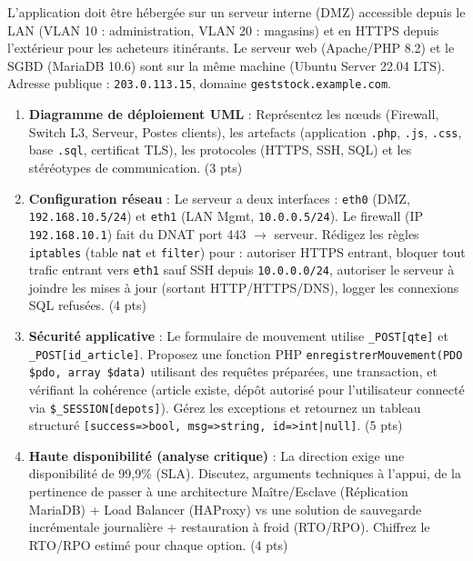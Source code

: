 \documentclass[11pt]{article}
\begin{document}
\begin{exercice}
L'application doit être hébergée sur un serveur interne (DMZ) accessible depuis le LAN (VLAN 10 : administration, VLAN 20 : magasins) et en HTTPS depuis l'extérieur pour les acheteurs itinérants. Le serveur web (Apache/PHP 8.2) et le SGBD (MariaDB 10.6) sont sur la même machine (Ubuntu Server 22.04 LTS). Adresse publique : \texttt{203.0.113.15}, domaine \texttt{geststock.example.com}.

\begin{enumerate}
    \item \textbf{Diagramme de déploiement UML} : Représentez les nœuds (Firewall, Switch L3, Serveur, Postes clients), les artefacts (application \texttt{.php}, \texttt{.js}, \texttt{.css}, base \texttt{.sql}, certificat TLS), les protocoles (HTTPS, SSH, SQL) et les stéréotypes de communication. (3 pts)
    \item \textbf{Configuration réseau} : Le serveur a deux interfaces : \texttt{eth0} (DMZ, \texttt{192.168.10.5/24}) et \texttt{eth1} (LAN Mgmt, \texttt{10.0.0.5/24}). Le firewall (IP \texttt{192.168.10.1}) fait du DNAT port 443 $\rightarrow$ serveur. Rédigez les règles \texttt{iptables} (table \texttt{nat} et \texttt{filter}) pour : autoriser HTTPS entrant, bloquer tout trafic entrant vers \texttt{eth1} sauf SSH depuis \texttt{10.0.0.0/24}, autoriser le serveur à joindre les mises à jour (sortant HTTP/HTTPS/DNS), logger les connexions SQL refusées. (4 pts)
    \item \textbf{Sécurité applicative} : Le formulaire de mouvement utilise \texttt{\textdollar\_POST[\textquotesingle qte\textquotesingle]} et \texttt{\textdollar\_POST[\textquotesingle id\_article\textquotesingle]}. Proposez une fonction PHP \texttt{enregistrerMouvement(PDO \$pdo, array \$data)} utilisant des requêtes préparées, une transaction, et vérifiant la cohérence (article existe, dépôt autorisé pour l'utilisateur connecté via \texttt{\$\_SESSION[\textquotesingle depots\textquotesingle]}). Gérez les exceptions et retournez un tableau structuré \texttt{[\textquotesingle success\textquotesingle=>bool, \textquotesingle msg\textquotesingle=>string, \textquotesingle id\textquotesingle=>int|null]}. (5 pts)
    \item \textbf{Haute disponibilité (analyse critique)} : La direction exige une disponibilité de 99,9\% (SLA). Discutez, arguments techniques à l'appui, de la pertinence de passer à une architecture Maître/Esclave (Réplication MariaDB) + Load Balancer (HAProxy) vs une solution de sauvegarde incrémentale journalière + restauration à froid (RTO/RPO). Chiffrez le RTO/RPO estimé pour chaque option. (4 pts)
\end{enumerate}
\end{exercice}
\end{document}
